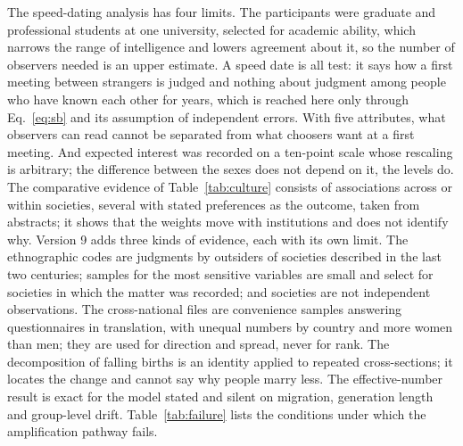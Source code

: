 The speed-dating analysis has four limits. The participants were graduate and professional students at one university,
selected for academic ability, which narrows the range of intelligence and lowers agreement about it, so the number of
observers needed is an upper estimate. A speed date is all test: it says how a first meeting between strangers is judged
and nothing about judgment among people who have known each other for years, which is reached here only through
Eq.~\eqref{eq:sb} and its assumption of independent errors. With five attributes, what observers can read cannot be
separated from what choosers want at a first meeting. And expected interest was recorded on a ten-point scale whose
rescaling is arbitrary; the difference between the sexes does not depend on it, the levels do. The comparative evidence
of Table~\ref{tab:culture} consists of associations across or within societies, several with stated preferences as the
outcome, taken from abstracts; it shows that the weights move with institutions and does not identify why.
Version 9 adds three kinds of evidence, each with its own limit. The ethnographic codes are judgments by outsiders of
societies described in the last two centuries; samples for the most sensitive variables are small and select for societies
in which the matter was recorded; and societies are not independent observations. The cross-national files are convenience
samples answering questionnaires in translation, with unequal numbers by country and more women than men; they are used
for direction and spread, never for rank. The decomposition of falling births is an identity applied to repeated
cross-sections; it locates the change and cannot say why people marry less. The effective-number result is exact for the
model stated and silent on migration, generation length and group-level drift.
Table~\ref{tab:failure} lists the conditions under which the amplification pathway fails.

